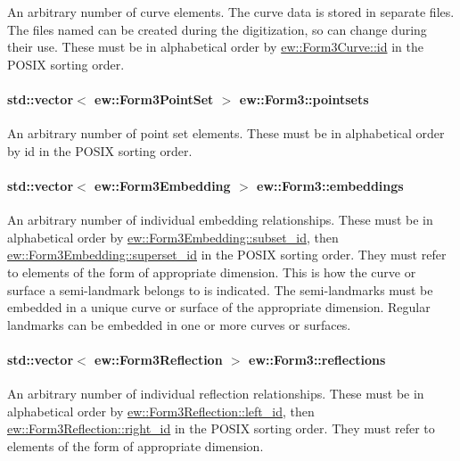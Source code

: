 \label{classew_1_1Form3_ab60def495fb8fea585dff2fb8c94d845}
An arbitrary number of curve elements. The curve data is stored in separate files. The files named can be created during the digitization, so can change during their use. These must be in alphabetical order by \hyperlink{classew_1_1Form3Curve_a2bb3648bb9d075b67572de31ceb4f9c9}{ew::Form3Curve::id} in the POSIX sorting order. \hypertarget{classew_1_1Form3_aed0e94682a4de9b871c8fb15906bcc09}{
\paragraph[{pointsets}]{\setlength{\rightskip}{0pt plus 5cm}std::vector$<$ {\bf ew::Form3PointSet} $>$ {\bf ew::Form3::pointsets}}\hfill}
\label{classew_1_1Form3_aed0e94682a4de9b871c8fb15906bcc09}
An arbitrary number of point set elements. These must be in alphabetical order by id in the POSIX sorting order. \hypertarget{classew_1_1Form3_a05ace76e2206ea825495538e93d9ba4c}{
\paragraph[{embeddings}]{\setlength{\rightskip}{0pt plus 5cm}std::vector$<$ {\bf ew::Form3Embedding} $>$ {\bf ew::Form3::embeddings}}\hfill}
\label{classew_1_1Form3_a05ace76e2206ea825495538e93d9ba4c}
An arbitrary number of individual embedding relationships. These must be in alphabetical order by \hyperlink{classew_1_1Form3Embedding_a80d00799de7bebf48c00d6cd264a656e}{ew::Form3Embedding::subset\_\-id}, then \hyperlink{classew_1_1Form3Embedding_a8aff0a6b37b54d177c15abfca9191f67}{ew::Form3Embedding::superset\_\-id} in the POSIX sorting order. They must refer to elements of the form of appropriate dimension. This is how the curve or surface a semi-\/landmark belongs to is indicated. The semi-\/landmarks must be embedded in a unique curve or surface of the appropriate dimension. Regular landmarks can be embedded in one or more curves or surfaces. \hypertarget{classew_1_1Form3_a4df1d049f2c5ca83f194d4ac9cf9f074}{
\paragraph[{reflections}]{\setlength{\rightskip}{0pt plus 5cm}std::vector$<$ {\bf ew::Form3Reflection} $>$ {\bf ew::Form3::reflections}}\hfill}
\label{classew_1_1Form3_a4df1d049f2c5ca83f194d4ac9cf9f074}
An arbitrary number of individual reflection relationships. These must be in alphabetical order by \hyperlink{classew_1_1Form3Reflection_a92f7f975175f01b8479fa8d40a6fba72}{ew::Form3Reflection::left\_\-id}, then \hyperlink{classew_1_1Form3Reflection_a81b3c3658154ec37de3f00b9af60e468}{ew::Form3Reflection::right\_\-id} in the POSIX sorting order. They must refer to elements of the form of appropriate dimension. 
